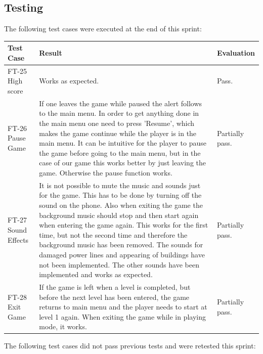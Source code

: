 \subsection{Testing}

	The following test cases were executed at the end of this sprint:


	\begin{tabular}{| p{3cm} | p{7cm} | p{2cm} |}
		\hline
		\rowcolor{lightgray}
		{\bf Test Case} & {\bf Result} & {\bf Evaluation} \\ \hline

		FT-25 High score & Works as expected. & Pass. \\ \hline

		FT-26 Pause Game & If one leaves the game while paused the alert follows to the main menu. In order 
		to get anything done in the main menu one need to press 'Resume', which makes the game continue while 
		the player is in the main menu. It can be intuitive for the player to pause the game before going to 
		the main menu, but in the case of our game this works better by just leaving the game. Otherwise the 
		pause function works. & Partially pass. \\ \hline

		FT-27 Sound Effects & It is not possible to mute the music and sounds just for the game. This has to 
		be done by turning off the sound on the phone. Also when exiting the game the background music should 
		stop and then start again when entering the game again. This works for the first time, but not the 
		second time and therefore the background music has been removed. The sounds for damaged power lines and appearing of buildings have not been implemented. The other sounds have been implemented and works as expected. & Partially pass. \\ \hline

		FT-28 Exit Game & If the game is left when a level is completed, but before the next level has been 
		entered, the game returns to main menu and the player needs to start at level 1 again. When exiting 
		the game while in playing mode, it works. & Partially pass. \\ \hline

	\end{tabular}

	The following test cases did not pass previous tests and were retested this sprint:


